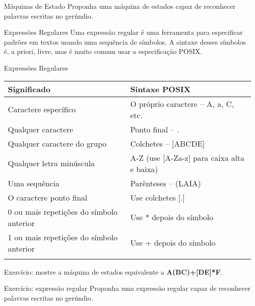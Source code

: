 \documentclass{beamer}
\begin{document}
\begin{frame}{Máquinas de Estado}
  \centering
  \large
  Proponha uma máquina de estados capaz de reconhecer palavras escritas no
  gerúndio.
\end{frame}


\begin{frame}{Expressões Regulares}
  \centering
  \large
  Uma expressão regular é uma ferramenta para especificar padrões em textos
  usando uma sequência de símbolos. A sintaxe desses símbolos é, a priori,
  livre, mas é muito comum usar a especificação POSIX.
\end{frame}



\begin{frame}[fragile]{Expressões Regulares}
  \centering
  \large
  \begin{tabular}{p{5cm} | p{5cm} }
    Significado & Sintaxe POSIX \\ \hline
    Caractere específico & O próprio caractere -- A, a, C, etc. \\ \hline
    Qualquer caractere & Ponto final -- . \\ \hline
    Qualquer caractere do grupo & Colchetes -- [ABCDE] \\ \hline
    Qualquer letra minúscula & A-Z (use [A-Za-z] para caixa alta e baixa) \\ \hline
    Uma sequência & Parênteses -- (LAIA) \\ \hline
    O caractere ponto final & Use colchetes [.] \\ \hline
    0 ou mais repetições do símbolo anterior & Use * depois do símbolo
    \\ \hline
    1 ou mais repetições do símbolo anterior & Use + depois do símbolo \\ \hline
    \\
  \end{tabular}

  Exercício: mostre a máquina de estados equivalente a \textbf{A(BC)+[DE]*F}.

\end{frame}

\begin{frame}{Exercício: expressão regular}
  \centering
  \large
  Proponha uma expressão regular capaz de reconhecer palavras escritas no
  gerúndio.
\end{frame}
\end{document}
